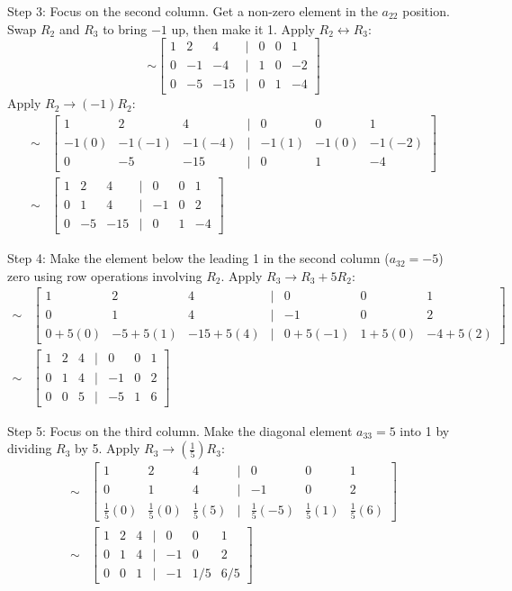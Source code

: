 \documentclass{article}
\begin{document}
Step 3: Focus on the second column. Get a non-zero element in the $a_{22}$ position. Swap $R_2$ and $R_3$ to bring $-1$ up, then make it 1.
Apply $R_2 \leftrightarrow R_3$:
\[ \sim \begin{bmatrix} 1 & 2 & 4 & | & 0 & 0 & 1 \\ 0 & -1 & -4 & | & 1 & 0 & -2 \\ 0 & -5 & -15 & | & 0 & 1 & -4 \end{bmatrix} \]
Apply $R_2 \to (-1)R_2$:
\begin{align*} \sim &\begin{bmatrix} 1 & 2 & 4 & | & 0 & 0 & 1 \\ -1(0) & -1(-1) & -1(-4) & | & -1(1) & -1(0) & -1(-2) \\ 0 & -5 & -15 & | & 0 & 1 & -4 \end{bmatrix} \\ \sim &\begin{bmatrix} 1 & 2 & 4 & | & 0 & 0 & 1 \\ 0 & 1 & 4 & | & -1 & 0 & 2 \\ 0 & -5 & -15 & | & 0 & 1 & -4 \end{bmatrix}\end{align*}

Step 4: Make the element below the leading 1 in the second column ($a_{32}=-5$) zero using row operations involving $R_2$.
Apply $R_3 \to R_3 + 5R_2$:
\begin{align*} \sim &\begin{bmatrix} 1 & 2 & 4 & | & 0 & 0 & 1 \\ 0 & 1 & 4 & | & -1 & 0 & 2 \\ 0 + 5(0) & -5 + 5(1) & -15 + 5(4) & | & 0 + 5(-1) & 1 + 5(0) & -4 + 5(2) \end{bmatrix} \\ \sim &\begin{bmatrix} 1 & 2 & 4 & | & 0 & 0 & 1 \\ 0 & 1 & 4 & | & -1 & 0 & 2 \\ 0 & 0 & 5 & | & -5 & 1 & 6 \end{bmatrix}\end{align*}

Step 5: Focus on the third column. Make the diagonal element $a_{33}=5$ into 1 by dividing $R_3$ by 5.
Apply $R_3 \to (\frac{1}{5})R_3$:
\begin{align*} \sim &\begin{bmatrix} 1 & 2 & 4 & | & 0 & 0 & 1 \\ 0 & 1 & 4 & | & -1 & 0 & 2 \\ \frac{1}{5}(0) & \frac{1}{5}(0) & \frac{1}{5}(5) & | & \frac{1}{5}(-5) & \frac{1}{5}(1) & \frac{1}{5}(6) \end{bmatrix} \\ \sim &\begin{bmatrix} 1 & 2 & 4 & | & 0 & 0 & 1 \\ 0 & 1 & 4 & | & -1 & 0 & 2 \\ 0 & 0 & 1 & | & -1 & 1/5 & 6/5 \end{bmatrix}\end{align*}
\end{document}
